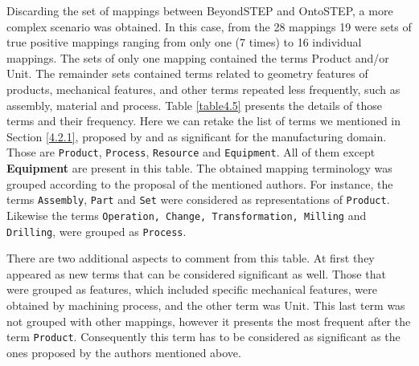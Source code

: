 Discarding the set of mappings between BeyondSTEP and OntoSTEP, a more complex scenario was obtained.  In this case, from the 28 mappings 19 were sets of true positive mappings ranging from only one (7 times) to 16 individual mappings. The sets of only one mapping contained the terms Product and/or Unit. The remainder sets contained terms related to geometry features of products, mechanical features, and other terms repeated less frequently, such as assembly, material and process. Table \ref{table4.5} presents the details of those terms and their frequency. Here we can retake the list of terms we mentioned in Section \ref{4.2.1}, proposed by \cite{martin_design_2003} and \cite{lastra_ontologies_2009} as significant for the manufacturing domain. Those  are \texttt{Product}, \texttt{Process}, \texttt{Resource} and \texttt{Equipment}. All of them except \textbf{Equipment} are present in this table. The obtained mapping terminology was grouped according to the proposal of the mentioned authors. For instance, the terms \texttt{Assembly}, \texttt{Part} and \texttt{Set} were considered as representations of \texttt{Product}. Likewise the terms \texttt{Operation, Change, Transformation, Milling} and \texttt{Drilling}, were grouped as \texttt{Process}. 


There are two additional aspects to comment from this table. At first they appeared as new terms that can be considered significant as well. Those that were grouped as features, which included specific mechanical features, were obtained by machining process, and the other term was Unit. This last term was not grouped with other mappings, however it presents the most frequent after the term \texttt{Product}. Consequently this term has to be considered as significant as the ones proposed by the authors mentioned above.


